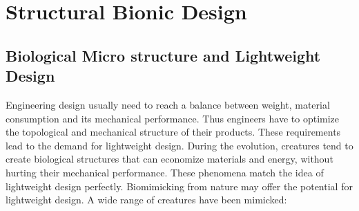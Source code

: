 
\chapter{Structural Bionic Design}

\newtheorem{thm}{定理}[section]

\newtheorem{lem}{引理}[section]

\newtheorem{cor}{推论}[section]

\section{Biological Micro structure and Lightweight Design}

Engineering design usually need to reach a balance between weight, material consumption and its mechanical performance. Thus engineers have to optimize the topological and mechanical structure of their products. These requirements lead to the demand for lightweight design. During the evolution, creatures tend to create biological structures that can economize materials and energy, without hurting their mechanical performance. These phenomena match the idea of lightweight design perfectly. Biomimicking from nature may offer the potential for lightweight design. A wide range of creatures have been mimicked:\\
